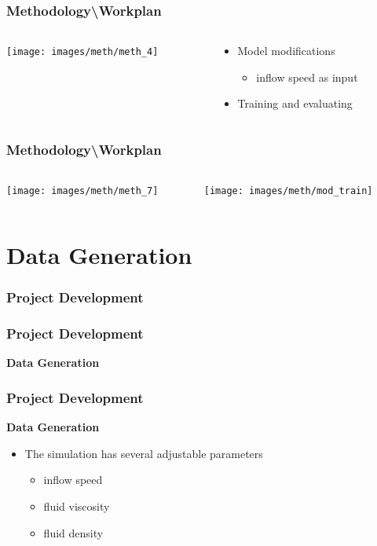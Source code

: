 \documentclass[18pt]{beamer}
\begin{document}
\begin{frame}[t]
  \frametitle{Methodology\textbackslash Workplan}
  \begin{columns}[t]
    \begin{column}{0.35\textwidth}
      \texttt{[image: images/meth/meth\_4]}
    \end{column}
    \begin{column}[t]{0.65\textwidth}
      \vspace*{-5cm}
      \begin{itemize}
      \item Model modifications
        \begin{itemize}
        \item inflow speed as input
        \end{itemize}
      \item Training and evaluating
      \end{itemize}
    \end{column}
  \end{columns}
\end{frame}


\begin{frame}
  \frametitle{Methodology\textbackslash Workplan}
  \begin{columns}
    \begin{column}{0.35\textwidth}
      \texttt{[image: images/meth/meth\_7]}
    \end{column}
    \begin{column}[c]{0.65\textwidth}
      \texttt{[image: images/meth/mod\_train]}
    \end{column}
  \end{columns}
\end{frame}



\section{Data Generation}

\begin{frame}[t]
  \frametitle{Project Development}
\end{frame}


\begin{frame}[t]
  \frametitle{Project Development}
  \large{\textbf{Data Generation}}
\end{frame}



\begin{frame}[t]
  \frametitle{Project Development}
  \large{\textbf{Data Generation}}

  \begin{itemize}
  \item The simulation has several adjustable parameters
    \begin{itemize}
    \item inflow speed
    \item fluid viscosity
    \item fluid density
    \end{itemize}
  \end{itemize}
  
\end{frame}
\end{document}
